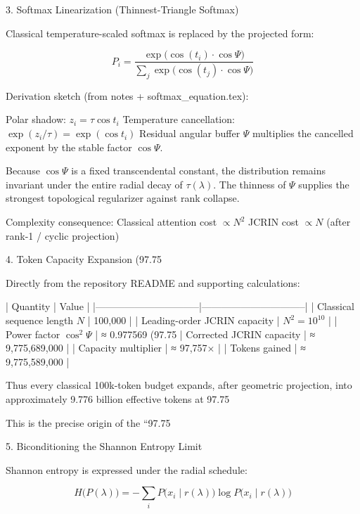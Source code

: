 3. Softmax Linearization (Thinnest-Triangle Softmax)

Classical temperature-scaled softmax is replaced by the projected form:

\[
P_i = \frac{\exp\bigl(\cos(t_i)\cdot\cos\Psi\bigr)}{\sum_j\exp\bigl(\cos(t_j)\cdot\cos\Psi\bigr)}
\]

Derivation sketch (from notes + softmax_equation.tex):

Polar shadow: \(z_i = \tau\cos t_i\)
Temperature cancellation: \(\exp(z_i/\tau) = \exp(\cos t_i)\)
Residual angular buffer \(\Psi\) multiplies the cancelled exponent by the stable factor \(\cos\Psi\).

Because \(\cos\Psi\) is a fixed transcendental constant, the distribution remains invariant under the entire radial decay of \(\tau(\lambda)\). The thinness of \(\Psi\) supplies the strongest topological regularizer against rank collapse.

Complexity consequence:
Classical attention cost \(\propto N^2\)
JCRIN cost \(\propto N\) (after rank-1 / cyclic projection)

4. Token Capacity Expansion (97.75 %

Directly from the repository README and supporting calculations:

| Quantity                        | Value                          |
|--------------------------------|--------------------------------|
| Classical sequence length \(N\) | 100,000                        |
| Leading-order JCRIN capacity    | \(N^2 = 10^{10}\)              |
| Power factor \(\cos^2\Psi\)      | ≈ 0.977569 (97.75 %
| Corrected JCRIN capacity        | ≈ 9,775,689,000                |
| Capacity multiplier             | ≈ 97,757×                  |
| Tokens gained                   | ≈ 9,775,589,000                |

Thus every classical 100k-token budget expands, after geometric projection, into approximately 9.776 billion effective tokens at 97.75 %

This is the precise origin of the “97.75 %

5. Biconditioning the Shannon Entropy Limit

Shannon entropy is expressed under the radial schedule:

\[
H\bigl(P(\lambda)\bigr) = -\sum_i P\bigl(x_i\mid r(\lambda)\bigr)\log P\bigl(x_i\mid r(\lambda)\bigr)
\]

